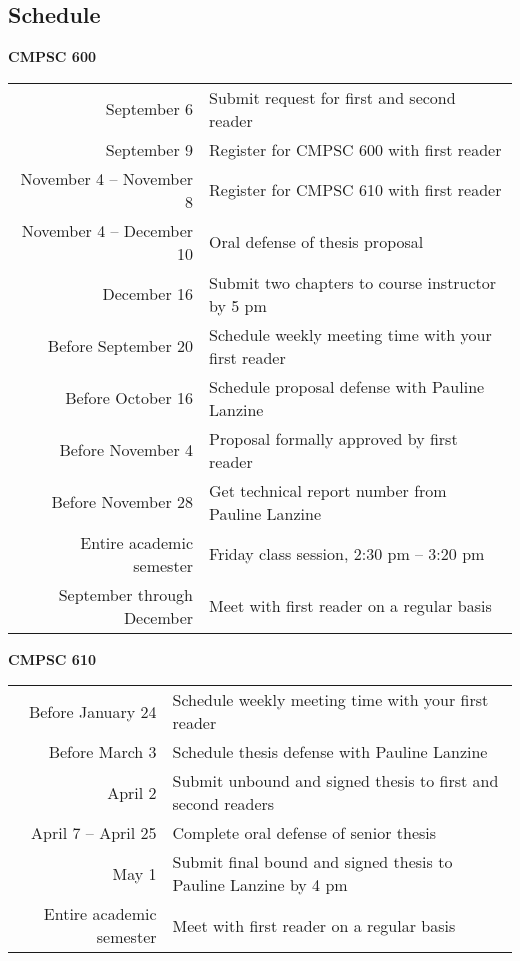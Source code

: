 \vspace*{-.1in}
\subsection*{Schedule}

{\bf CMPSC 600}
\begin{center}
\begin{tabular}{r|l}
\hline
September 6 & Submit request for first and second reader \\ 
September 9 & Register for CMPSC 600 with first reader \\ 
November 4 -- November 8 & Register for CMPSC 610 with first reader \\
November 4 -- December 10 & Oral defense of thesis proposal \\
December 16 & Submit two chapters to course instructor by 5 pm\\
\hline
Before September 20 & Schedule weekly meeting time with your first reader \\
Before October 16 & Schedule proposal defense with Pauline Lanzine \\
Before November 4 & Proposal formally approved by first reader \\
Before November 28 & Get technical report number from Pauline Lanzine\\
\hline
Entire academic semester & Friday class session, 2:30 pm -- 3:20 pm \\
September through December & Meet with first reader on a regular basis \\
\hline
\end{tabular}
\end{center}


\noindent
{\bf CMPSC 610}
\begin{center}
\begin{tabular}{r|l}
\hline
Before January 24 & Schedule weekly meeting time with your first reader \\ 
Before March 3 & Schedule thesis defense with Pauline Lanzine \\
April 2 & Submit unbound and signed thesis to first and second readers \\
April 7 -- April 25 & Complete oral defense of senior thesis \\
May 1 & Submit final bound and signed thesis to Pauline Lanzine by 4 pm\\
\hline
Entire academic semester & Meet with first reader on a regular basis \\ 
\hline
\end{tabular}
\end{center}

